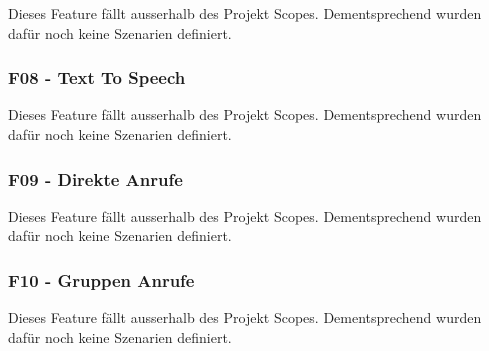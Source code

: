 Dieses Feature fällt ausserhalb des Projekt Scopes. Dementsprechend wurden dafür noch keine Szenarien definiert.

\subsubsection*{F08 - Text To Speech}
Dieses Feature fällt ausserhalb des Projekt Scopes. Dementsprechend wurden dafür noch keine Szenarien definiert.

\subsubsection*{F09 - Direkte Anrufe}
Dieses Feature fällt ausserhalb des Projekt Scopes. Dementsprechend wurden dafür noch keine Szenarien definiert.

\subsubsection*{F10 - Gruppen Anrufe}
Dieses Feature fällt ausserhalb des Projekt Scopes. Dementsprechend wurden dafür noch keine Szenarien definiert.



